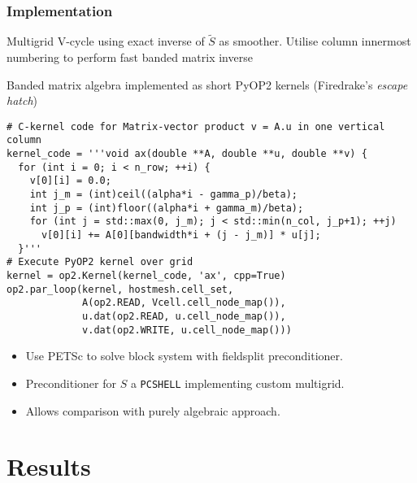 \documentclass[presentation]{beamer}
\begin{document}
\begin{frame}
  \frametitle{Implementation}
  Multigrid V-cycle using exact inverse of $\tilde{S}$ as smoother.
  Utilise column innermost numbering to perform fast banded matrix
  inverse
  \begin{center}
  \end{center}

\framebreak

Banded matrix algebra implemented as short PyOP2 kernels (Firedrake's
\emph{escape hatch})

\begin{verbatim}
# C-kernel code for Matrix-vector product v = A.u in one vertical column
kernel_code = '''void ax(double **A, double **u, double **v) {
  for (int i = 0; i < n_row; ++i) {
    v[0][i] = 0.0;
    int j_m = (int)ceil((alpha*i - gamma_p)/beta);
    int j_p = (int)floor((alpha*i + gamma_m)/beta);
    for (int j = std::max(0, j_m); j < std::min(n_col, j_p+1); ++j)
      v[0][i] += A[0][bandwidth*i + (j - j_m)] * u[j];
  }'''
# Execute PyOP2 kernel over grid
kernel = op2.Kernel(kernel_code, 'ax', cpp=True)
op2.par_loop(kernel, hostmesh.cell_set,
             A(op2.READ, Vcell.cell_node_map()),
             u.dat(op2.READ, u.cell_node_map()),
             v.dat(op2.WRITE, u.cell_node_map()))
\end{verbatim}

\framebreak

\begin{itemize}
\item Use PETSc to solve block system with fieldsplit preconditioner.
\item Preconditioner for $S$ a \verb|PCSHELL| implementing custom
  multigrid.
\item Allows comparison with purely algebraic approach.
\end{itemize}
\end{frame}

\section{Results}
\end{document}
